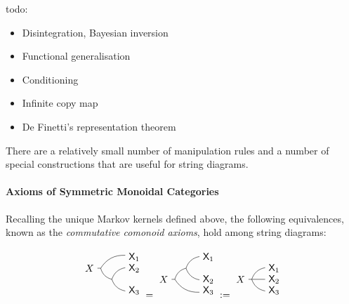 todo:
\begin{itemize}
\item Disintegration, Bayesian inversion
\item Functional generalisation
\item Conditioning
\item Infinite copy map
\item De Finetti's representation theorem
\end{itemize}

There are a relatively small number of manipulation rules and a number of special constructions that are useful for string diagrams.

\paragraph{Axioms of Symmetric Monoidal Categories}

Recalling the unique Markov kernels defined above, the following equivalences, known as the \emph{commutative comonoid axioms}, hold among string diagrams:

\begin{align}
	\begin{tikzpicture}[scale=0.8]
	\path (0,0) node (X) {$X$} 
	++ (0.5,0) coordinate (copy0)
	+ (1.5,0.5) node (X1) {$\RV{X}_1$}
	++ (0.5,-0.5) coordinate (copy1)
	+(1,0.5) node (X2) {$\RV{X}_2$}
	+(1,-0.5) node (X3) {$\RV{X}_3$};
	\draw (X) -- (copy0) to [bend left] (X1) (copy0) to [bend right] (copy1) to [bend left] (X2) (copy1) to [bend right] (X3);
	\end{tikzpicture}
	=
	\begin{tikzpicture}[scale=0.8]
	\path (0,0) node (X) {$X$} 
	++ (0.5,0) coordinate (copy0)
	+ (1.5,-0.5) node (X1) {$\RV{X}_3$}
	++ (0.5,0.5) coordinate (copy1)
	+(1,0.5) node (X2) {$\RV{X}_1$}
	+(1,-0.5) node (X3) {$\RV{X}_2$};
	\draw (X) -- (copy0) to [bend right] (X1) (copy0) to [bend left] (copy1) to [bend left] (X2) (copy1) to [bend right] (X3);
	\end{tikzpicture}
	:=
	\begin{tikzpicture}[scale=0.8]
	\path (0,0) node (X) {$X$} 
	++ (0.5,0) coordinate (copy0)
	+ (1,0.5) node (X1) {$\RV{X}_1$}
	+(1,0) node (X2) {$\RV{X}_2$}
	+(1,-0.5) node (X3) {$\RV{X}_3$};
	\draw (X) -- (copy0) to [bend left] (X1) (copy0) to (X2) (copy0) to [bend right] (X3);
	\end{tikzpicture}\label{eq:ccom1}
\end{align}

